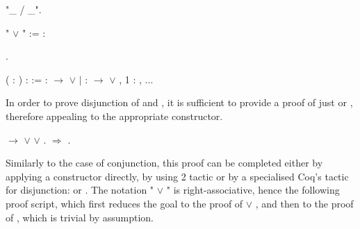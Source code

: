\begin{coqdoccode}
\coqdocemptyline
\coqdocnoindent
{} "\_ / \_".\coqdoceol
\coqdocemptyline
\end{coqdoccode}
" \ensuremath{\lor} " :=      :  \begin{coqdoccode}
\coqdocemptyline
\coqdocnoindent
{} .\coqdoceol
\coqdocemptyline
\end{coqdoccode}


\coqdoceol
\coqdocemptyline
\coqdocnoindent
{}  (  : ) :  :=\coqdoceol
\coqdocindent{2.00em}
 :  \ensuremath{\rightarrow}  \ensuremath{\lor}  \ensuremath{|}  :  \ensuremath{\rightarrow}  \ensuremath{\lor} \coqdoceol
\coqdocnoindent
\coqdoceol
\coqdocnoindent
{} ,      1 :\coqdoceol
\coqdocindent{1.00em}
 ,   \coqdoceol
\coqdocnoindent
...

\coqdocemptyline




In order to prove disjunction of  and , it is sufficient to
provide a proof of just  or , therefore appealing to the
appropriate constructor.


\begin{coqdoccode}
\coqdocemptyline
\coqdocnoindent
{}  \ensuremath{\rightarrow}  \ensuremath{\lor}  \ensuremath{\lor} .\coqdoceol
\coqdocnoindent
{}\ensuremath{\Rightarrow} .\coqdoceol
\coqdocemptyline
\end{coqdoccode}


Similarly to the case of conjunction, this proof can be completed
either by applying a constructor directly, by using  2
tactic or by a specialised Coq's tactic for disjunction:
 or . The notation "\coqdocvar{\_} \ensuremath{\lor} \coqdocvar{\_}" is
right-associative, hence the following proof script, which first
reduces the goal to the proof of  \ensuremath{\lor} , and then to the proof of
, which is trivial by assumption.


